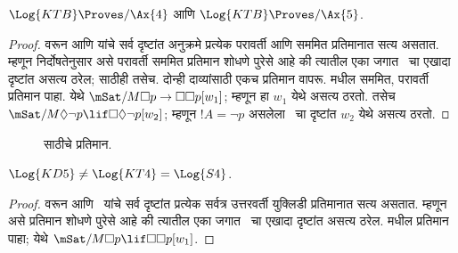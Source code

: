 \documentclass[../../../include/open-logic-section]{subfiles}
\begin{document}
\begin{thm}
  $\Log{KTB} \Proves/ \Ax{4}$ आणि $\Log{KTB} \Proves/ \Ax{5}$.
\end{thm}

\begin{proof}
   वरून
   आणि  यांचे सर्व दृष्टांत
  अनुक्रमे प्रत्येक परावर्ती आणि सममित प्रतिमानात
  सत्य असतात. म्हणून निर्दोषतेनुसार असे
  परावर्ती सममित प्रतिमान शोधणे पुरेसे आहे की
  त्यातील एका जगात~ चा एखादा दृष्टांत
  असत्य ठरेल;  साठीही तसेच.
  दोन्ही दाव्यांसाठी एकच प्रतिमान वापरू.
   मधील सममित, परावर्ती
  प्रतिमान पाहा. येथे $\mSat/{M}{\Box p \to \Box \Box
    p}[w_1]$; म्हणून  हा $w_1$ येथे
  असत्य ठरतो. तसेच $\mSat/{M}{\Diamond
    \lnot p \lif \Box \Diamond \lnot p}[w_2]$;
  म्हणून $!A = \lnot p$ असलेला~ चा
  दृष्टांत $w_2$ येथे असत्य ठरतो.
\end{proof}

\begin{figure}[htpb]
  \centering
  \caption{ साठीचे प्रतिमान.}
\end{figure}

\begin{thm}
  $\Log{KD5} \neq \Log{KT4} = \Log{S4}$.
\end{thm}

\begin{proof}
   वरून
   आणि~ यांचे सर्व दृष्टांत
  प्रत्येक सर्वत्र उत्तरवर्ती युक्लिडी प्रतिमानात
  सत्य असतात. म्हणून असे प्रतिमान शोधणे पुरेसे
  आहे की त्यातील एका जगात~ चा एखादा
  दृष्टांत असत्य ठरेल. 
  मधील प्रतिमान पाहा; येथे
  $\mSat/{M}{\Box p
  \lif \Box\Box p}[w_1]$.
\end{proof}
\end{document}
